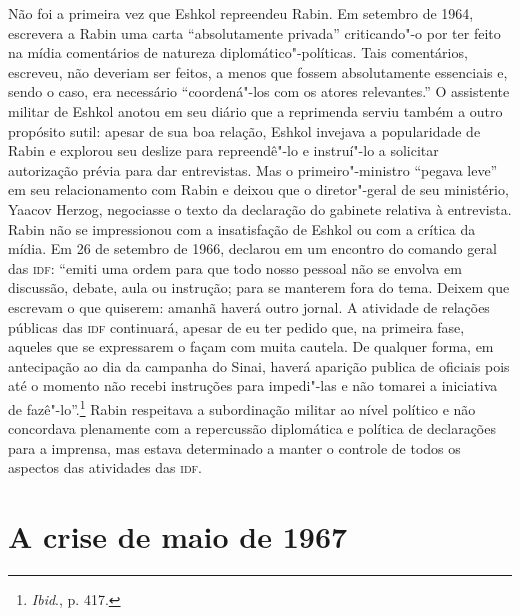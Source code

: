 Não foi a primeira vez que Eshkol repreendeu Rabin. Em setembro de 1964,
escrevera a Rabin uma carta ``absolutamente privada'' criticando"-o
por ter feito na mídia comentários de natureza diplomático"-políticas.
Tais comentários, escreveu, não deveriam ser feitos, a menos que fossem
absolutamente essenciais e, sendo o caso, era necessário ``coordená"-los
com os atores relevantes.'' O assistente militar de Eshkol anotou em seu
diário que a reprimenda serviu também a outro propósito sutil: apesar de
sua boa relação, Eshkol invejava a popularidade de Rabin e explorou seu
deslize para repreendê"-lo e instruí"-lo a solicitar autorização prévia
para dar entrevistas. Mas o primeiro"-ministro ``pegava leve'' em seu
relacionamento com Rabin e deixou que o diretor"-geral de seu ministério,
Yaacov Herzog, negociasse o texto da declaração do gabinete relativa à
entrevista. Rabin não se impressionou com a insatisfação de
Eshkol ou com a crítica da mídia. Em 26 de setembro de 1966, declarou em um
encontro do comando geral das \textsc{idf}: ``emiti uma ordem para que todo nosso
pessoal não se envolva em discussão, debate, aula ou instrução; para se
manterem fora do tema. Deixem que escrevam o que quiserem: amanhã haverá
outro jornal. A atividade de relações públicas das \textsc{idf} continuará,
apesar de eu ter pedido que, na primeira fase, aqueles que se
expressarem o façam com muita cautela. De qualquer forma, em antecipação
ao dia da campanha do Sinai, haverá aparição publica de oficiais pois
até o momento não recebi instruções para impedi"-las e não tomarei a
iniciativa de fazê"-lo''.\footnote{\textit{Ibid}., p. 417.} Rabin respeitava a subordinação
militar ao nível político e não concordava plenamente com a repercussão
diplomática e política de declarações para a imprensa, mas estava
determinado a manter o controle de todos os aspectos das atividades das
\textsc{idf}.

\section{A crise de maio de 1967}

